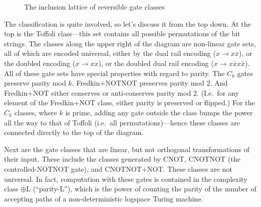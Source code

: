 \documentclass[12pt]{report}
\theoremstyle{plain}
\theoremstyle{definition}
\newcommand{\NOTNOT}{\operatorname{NOTNOT}}
\newcommand{\Fredkin}{\operatorname{Fredkin}}
\begin{document}
\begin{figure}[ptb]
\begin{center}
\end{center}
\caption{The inclusion lattice of reversible gate classes}%
\label{ReversibleFigure}
\end{figure}

The classification is quite involved, so let's discuss it from the top down. At the top is the Toffoli class---this set contains all possible permutations of the bit strings. The classes along the upper right of the diagram are non-linear gate sets, all of which are encoded universal, either by the dual rail encoding ($x\rightarrow x\bar{x}$), or the doubled encoding ($x\rightarrow xx$), or the doubled dual rail encoding ($x\rightarrow x\bar{x}x\bar{x}$). All of these gate sets have special properties with regard to parity. The $C_k$ gates preserve parity mod $k$. Fredkin+NOTNOT preserves parity mod 2. And Fredkin+NOT either conserves or anti-conserves parity mod 2. (I.e.\ for any element of the Fredkin+NOT class, either parity is preserved or flipped.) For the $C_k$ classes, where $k$ is prime, adding any gate outside the class bumps the power all the way to that of Toffoli (i.e.\ all permutations)---hence these classes are connected directly to the top of the diagram.

Next are the gate classes that are linear, but not orthogonal transformations of their input. These include the classes generated by CNOT, CNOTNOT (the controlled-NOTNOT gate), and CNOTNOT+NOT.  These classes are not universal. In fact, computation with these gates is contained in the complexity class $\oplus$\textsf{L} (``parity-L''), which is the power of counting the parity of the number of accepting paths of a non-deterministic logspace Turing machine.
\end{document}
